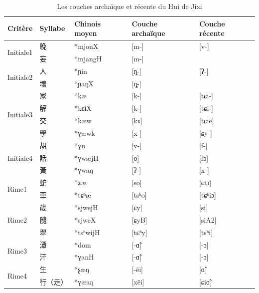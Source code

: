 \documentclass{scrbook}
\newcounter{c}[subsubsection]
\newcommand{\difwenbai}{couches archaïque et récente\xspace}
\begin{document}
\begin{sloppypar}
\begin{table}[htbp]
  \centering
    \begin{tabular}{lllll}
    \toprule
    Critère & Syllabe & Chinois moyen  & Couche archaïque & Couche récente \\
    \midrule
    \multirow{2}[2]{*}{Initiale1} & 晚     & *mjonX & [m-]  & [v-] \\
          & 妄     & *mjangH & [m-]  &  \\
    \midrule
    \multirow{2}[2]{*}{Initiale2} & 人     & *ɲin  & [ȵ-]  & [ʔ-] \\
          & 壤     & *ɲaŋX & [ȵ-]  &  \\
    \midrule
    \multirow{4}[2]{*}{Initiale3} & 家     & *kæ   & [k-]  & [tɕi-] \\
          & 解     & *kɛɨX & [k-]  & [tɕi-] \\
          & 交     & *kæw  & [kɤ]  & [tɕie] \\
          & 學     & *ɣæwk & [x-]  & [ɕy-] \\
    \midrule
    \multirow{3}[2]{*}{Initiale4} & 胡     & *ɣu   & [v-]  & [f-] \\
          & 話     & *ɣwæjH & [ɵ]   & [fɔ] \\
          & 黃     & *ɣwaŋ & [ʔ-]  & [x-] \\
    \midrule
    \multirow{2}[2]{*}{Rime1} & 蛇     & *ʑæ   & [so]  & [ɕiɔ] \\
          & 車     & *tɕʰæ & [tsʰo] & [tɕʰiɔ] \\
    \midrule
    \multirow{3}[2]{*}{Rime2} & 歲     & *sjwejH & [ɕy]  & [si] \\
          & 髓     & *sjweX & [ɕyB] & [siA2] \\
          & 翠     & *tsʰwijH & [tɕʰy] & [tsʰi] \\
    \midrule
    \multirow{2}[2]{*}{Rime3} & 潭     & *dom  & [-ɑ̃] & [-ɔ] \\
          & 汗     & *ɣanH & [-ɑ̃] & [-ɔ] \\
    \midrule
    \multirow{2}[2]{*}{Rime4} & 生     & *ʂæŋ  & [-ẽi] & [ɑ̃] \\
          & 行（走）  & *ɣæaŋ & [xẽi] & [ɕiɑ̃] \\
    \bottomrule
    \end{tabular}%
  \caption{Les \difwenbai du Hui de Jixi}    
  \label{tab:Jixi1}%
\end{table}%


\end{sloppypar}
\end{document}
